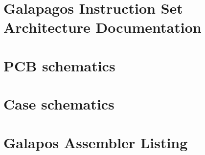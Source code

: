 \appendix
\chapter{Galapagos Instruction Set Architecture Documentation} \label{appendix:isa}
\newpage


\chapter{PCB schematics} \label{appendix:pcb-schematics}
\newpage



















\chapter{Case schematics} \label{appendix:case-schematics}
\newpage

\chapter{Galapos Assembler Listing} \label{appendix:galapagos-assembler-source-code}
\newpage







